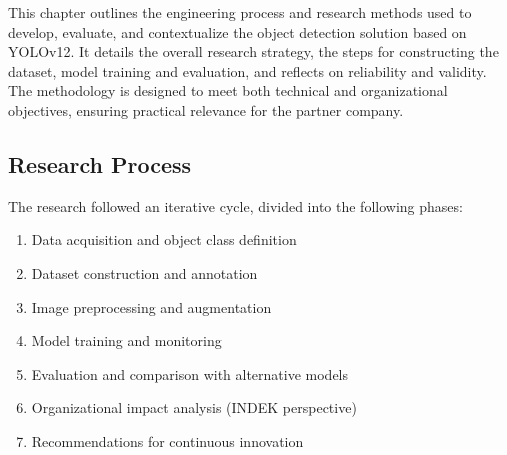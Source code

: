 \documentclass[a4paper,10pt,twocolumn]{article}
\numberwithin{figure}{section}
\numberwithin{table}{section}
\begin{document}



This chapter outlines the engineering process and research methods 
used to develop, evaluate, and contextualize the object detection solution 
based on YOLOv12. It details the overall research strategy, the steps for 
constructing the dataset, model training and evaluation, and reflects on 
reliability and validity. The methodology is designed to meet both technical 
and organizational objectives, ensuring practical relevance for the partner company.




\subsection{Research Process}
The research followed an iterative cycle, divided into the following phases:

\begin{enumerate} 
    \item Data acquisition and object class definition
    \item Dataset construction and annotation
    \item Image preprocessing and augmentation
    \item Model training and monitoring
    \item Evaluation and comparison with alternative models
    \item Organizational impact analysis (INDEK perspective)
    \item Recommendations for continuous innovation
\end{enumerate} 
\end{document}
